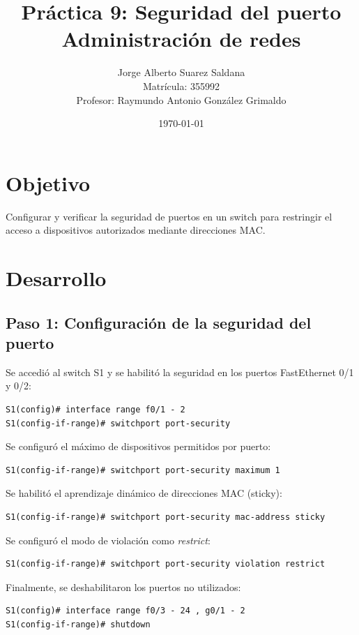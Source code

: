 \documentclass[12pt]{article}
\title{
Práctica 9: Seguridad del puerto\\[0.5em]
\large Administración de redes
}
\author{
Jorge Alberto Suarez Saldana\\
\small Matrícula: 355992\\
\small Profesor: Raymundo Antonio González Grimaldo
}
\date{\today}
\begin{document}
\maketitle

\section{Objetivo}
Configurar y verificar la seguridad de puertos en un switch para restringir el acceso a dispositivos autorizados mediante direcciones MAC.

\section{Desarrollo}

\subsection{Paso 1: Configuración de la seguridad del puerto}

Se accedió al switch S1 y se habilitó la seguridad en los puertos FastEthernet 0/1 y 0/2:

\begin{lstlisting}
S1(config)# interface range f0/1 - 2
S1(config-if-range)# switchport port-security
\end{lstlisting}

Se configuró el máximo de dispositivos permitidos por puerto:

\begin{lstlisting}
S1(config-if-range)# switchport port-security maximum 1
\end{lstlisting}

Se habilitó el aprendizaje dinámico de direcciones MAC (sticky):

\begin{lstlisting}
S1(config-if-range)# switchport port-security mac-address sticky
\end{lstlisting}

Se configuró el modo de violación como \textit{restrict}:

\begin{lstlisting}
S1(config-if-range)# switchport port-security violation restrict
\end{lstlisting}

Finalmente, se deshabilitaron los puertos no utilizados:

\begin{lstlisting}
S1(config)# interface range f0/3 - 24 , g0/1 - 2
S1(config-if-range)# shutdown
\end{lstlisting}
\end{document}
